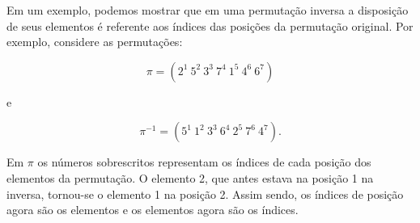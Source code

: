 Em um exemplo, podemos mostrar que em uma permutação inversa a disposição de seus elementos é referente aos índices das posições da permutação original. Por exemplo, considere as permutações:

  \[ \pi = (2^1 \ 5^2 \ 3^3 \ 7^4 \ 1^5 \ 4^6 \ 6^7)\] 
  \begin{center} e \end{center}
 \[ \pi^{-1} = (5^1 \ 1^2 \ 3^3 \ 6^4 \ 2^5 \ 7^6 \ 4^7).\]
 
 Em $\pi$ os números sobrescritos representam os índices de cada posição dos elementos da permutação. O elemento 2, que antes estava na posição 1 na inversa, tornou-se o elemento 1 na posição 2. Assim sendo, os índices de posição agora são os elementos e os elementos agora são os índices.



 
 
 
 
     
 


